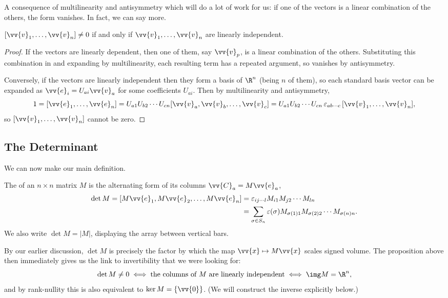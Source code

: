 A consequence of multilinearity and antisymmetry which will do a lot of work for us: if one of the vectors is a linear combination of the others, the form vanishes. In fact, we can say more.

\begin{proposition}
	$[\vv{v}_1, \dots, \vv{v}_n] \neq 0$ if and only if $\vv{v}_1, \dots, \vv{v}_n$ are linearly independent.
\end{proposition}
\begin{proof}
	If the vectors are linearly dependent, then one of them, say $\vv{v}_p$, is a linear combination of the others. Substituting this combination in and expanding by multilinearity, each resulting term has a repeated argument, so vanishes by antisymmetry.

	Conversely, if the vectors are linearly independent then they form a basis of $\R^n$ (being $n$ of them), so each standard basis vector can be expanded as $\vv{e}_i = U_{ai}\vv{v}_a$ for some coefficients $U_{ai}$. Then by multilinearity and antisymmetry,
	$$
	1 = [\vv{e}_1, \dots, \vv{e}_n] = U_{a1}U_{b2}\cdots U_{cn}[\vv{v}_a, \vv{v}_b, \dots, \vv{v}_c] = U_{a1}U_{b2}\cdots U_{cn}\, \varepsilon_{ab \cdots c} \, [\vv{v}_1, \dots, \vv{v}_n],
	$$
	so $[\vv{v}_1, \dots, \vv{v}_n]$ cannot be zero.
\end{proof}

\subsection{The Determinant}

We can now make our main definition.

\begin{definition}[Determinant]
	The  of an $n \times n$ matrix $M$ is the alternating form of its columns $\vv{C}_a = M \vv{e}_a$,
	\begin{align*}
		\det M = [M \vv{e}_1, M\vv{e}_2, \dots, M \vv{e}_n] &= \varepsilon_{ij \cdots l}M_{i1}M_{j2}\cdots M_{ln} \\
		&= \sum_{\sigma \in S_n} \varepsilon(\sigma) M_{\sigma(1)1}M_{\sigma(2)2}\cdots M_{\sigma(n)n}.
	\end{align*}
	We also write $\det M = |M|$, displaying the array between vertical bars.
\end{definition}

By our earlier discussion, $\det M$ is precisely the factor by which the map $\vv{x} \mapsto M\vv{x}$ scales signed volume. The proposition above then immediately gives us the link to invertibility that we were looking for:
$$
\det M \neq 0 \iff \text{the columns of } M \text{ are linearly independent} \iff \img M = \R^n,
$$
and by rank-nullity this is also equivalent to $\ker M = \{\vv{0}\}$. (We will construct the inverse explicitly below.)

